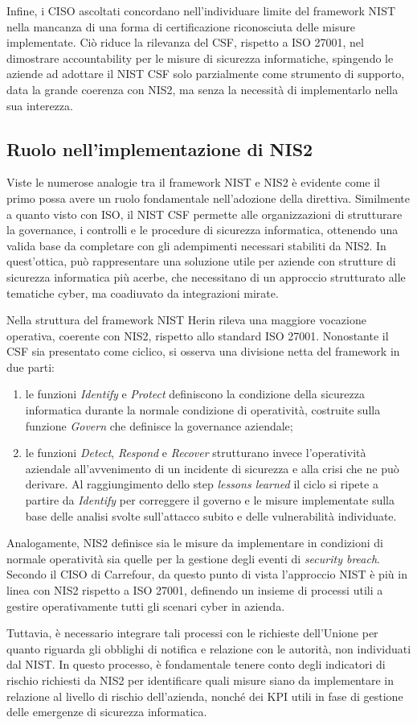Infine, i CISO ascoltati concordano nell'individuare limite del framework NIST nella mancanza di una forma di certificazione riconosciuta delle misure implementate. 
Ciò riduce la rilevanza del CSF, rispetto a ISO 27001, nel dimostrare accountability per le misure di sicurezza informatiche, spingendo le aziende ad adottare
il NIST CSF solo parzialmente come strumento di supporto, data la grande coerenza con NIS2, ma senza la necessità di implementarlo nella sua interezza.


\subsection{Ruolo nell'implementazione di NIS2}
Viste le numerose analogie tra il framework NIST e NIS2 è evidente come il primo possa avere un ruolo fondamentale
nell'adozione della direttiva. Similmente a quanto visto con ISO, il NIST CSF permette alle organizzazioni di strutturare la governance,
i controlli e le procedure di sicurezza informatica, ottenendo una valida base da completare con gli adempimenti necessari
stabiliti da NIS2. In quest'ottica, può rappresentare una soluzione utile per aziende con strutture di sicurezza
informatica più acerbe, che necessitano di un approccio strutturato alle tematiche cyber, ma coadiuvato da integrazioni mirate.

Nella struttura del framework NIST Herin rileva una maggiore vocazione operativa, coerente con NIS2, rispetto allo standard ISO 27001. 
Nonostante il CSF sia presentato come ciclico, si osserva una divisione netta del framework in due parti:
\begin{enumerate}
    \item le funzioni \textit{Identify} e \textit{Protect} definiscono la condizione della sicurezza informatica durante
    la normale condizione di operatività, costruite sulla funzione \textit{Govern} che definisce la governance aziendale;
    \item le funzioni \textit{Detect}, \textit{Respond} e \textit{Recover} strutturano invece l'operatività aziendale
    all'avvenimento di un incidente di sicurezza e alla crisi che ne può derivare. Al raggiungimento dello step \textit{lessons learned}
    il ciclo si ripete a partire da \textit{Identify} per correggere il governo e le misure implementate sulla base delle analisi
    svolte sull'attacco subito e delle vulnerabilità individuate.
\end{enumerate}
Analogamente, NIS2 definisce sia le misure da implementare in condizioni di normale operatività sia quelle per la gestione
degli eventi di \textit{security breach}. Secondo il CISO di Carrefour, da questo punto di vista l'approccio NIST è più in linea 
con NIS2 rispetto a ISO 27001, definendo un insieme di processi utili a gestire operativamente tutti gli scenari cyber in azienda.

Tuttavia, è necessario integrare tali processi con le richieste dell'Unione per quanto 
riguarda gli obblighi di notifica e relazione con le autorità, non individuati dal NIST. 
In questo processo, è fondamentale tenere conto degli indicatori di rischio richiesti da NIS2 per identificare quali
misure siano da implementare in relazione al livello di rischio dell'azienda, nonché dei KPI utili in fase di gestione
delle emergenze di sicurezza informatica.

